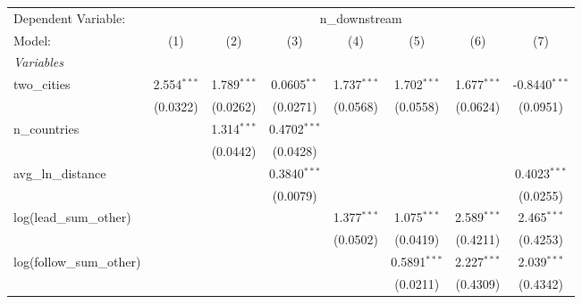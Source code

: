 
\begingroup
\centering
\begin{tabular}{lccccccc}
   \tabularnewline \midrule \midrule
   Dependent Variable: & \multicolumn{7}{c}{n\_downstream}\\
   Model:                                                      & (1)           & (2)           & (3)            & (4)           & (5)            & (6)             & (7)\\  
   \midrule
   \emph{Variables}\\
   two\_cities                                                 & 2.554$^{***}$ & 1.789$^{***}$ & 0.0605$^{**}$  & 1.737$^{***}$ & 1.702$^{***}$  & 1.677$^{***}$   & -0.8440$^{***}$\\   
                                                               & (0.0322)      & (0.0262)      & (0.0271)       & (0.0568)      & (0.0558)       & (0.0624)        & (0.0951)\\   
   n\_countries                                                &               & 1.314$^{***}$ & 0.4702$^{***}$ &               &                &                 &   \\   
                                                               &               & (0.0442)      & (0.0428)       &               &                &                 &   \\   
   avg\_ln\_distance                                           &               &               & 0.3840$^{***}$ &               &                &                 & 0.4023$^{***}$\\   
                                                               &               &               & (0.0079)       &               &                &                 & (0.0255)\\   
   log(lead\_sum\_other)                                       &               &               &                & 1.377$^{***}$ & 1.075$^{***}$  & 2.589$^{***}$   & 2.465$^{***}$\\   
                                                               &               &               &                & (0.0502)      & (0.0419)       & (0.4211)        & (0.4253)\\   
   log(follow\_sum\_other)                                     &               &               &                &               & 0.5891$^{***}$ & 2.227$^{***}$   & 2.039$^{***}$\\   
                                                               &               &               &                &               & (0.0211)       & (0.4309)        & (0.4342)\\   

\end{tabular}
